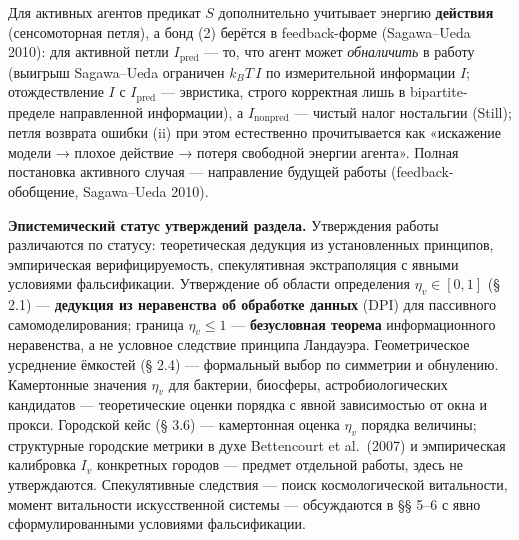 \documentclass[pdflatex,sn-mathphys-ay]{sn-jnl}
\begin{document}
Для активных агентов предикат \(S\) дополнительно учитывает энергию \textbf{действия} (сенсомоторная петля), а бонд (2) берётся в feedback-форме (Sagawa--Ueda 2010): для активной петли \(I_{\text{pred}}\) --- то, что агент может \emph{обналичить} в работу (выигрыш Sagawa--Ueda ограничен \(k_B T\,I\) по измерительной информации \(I\); отождествление \(I\) с \(I_{\text{pred}}\) --- эвристика, строго корректная лишь в bipartite-пределе направленной информации), а \(I_{\text{nonpred}}\) --- чистый налог ностальгии (Still); петля возврата ошибки (ii) при этом естественно прочитывается как «искажение модели → плохое действие → потеря свободной энергии агента». Полная постановка активного случая --- направление будущей работы (feedback-обобщение, Sagawa--Ueda 2010).

\textbf{Эпистемический статус утверждений раздела.} Утверждения работы различаются по статусу: теоретическая дедукция из установленных принципов, эмпирическая верифицируемость, спекулятивная экстраполяция с явными условиями фальсификации. Утверждение об области определения \(\eta_v \in [0,1]\) (§ 2.1) --- \textbf{дедукция из неравенства об обработке данных} (DPI) для пассивного самомоделирования; граница \(\eta_v \le 1\) --- \textbf{безусловная теорема} информационного неравенства, а не условное следствие принципа Ландауэра. Геометрическое усреднение ёмкостей (§ 2.4) --- формальный выбор по симметрии и обнулению. Камертонные значения \(\eta_v\) для бактерии, биосферы, астробиологических кандидатов --- теоретические оценки порядка с явной зависимостью от окна и прокси. Городской кейс (§ 3.6) --- камертонная оценка \(\eta_v\) порядка величины; структурные городские метрики в духе Bettencourt et al.~(2007) и эмпирическая калибровка \(I_v\) конкретных городов --- предмет отдельной работы, здесь не утверждаются. Спекулятивные следствия --- поиск космологической витальности, момент витальности искусственной системы --- обсуждаются в §§ 5--6 с явно сформулированными условиями фальсификации.
\end{document}
